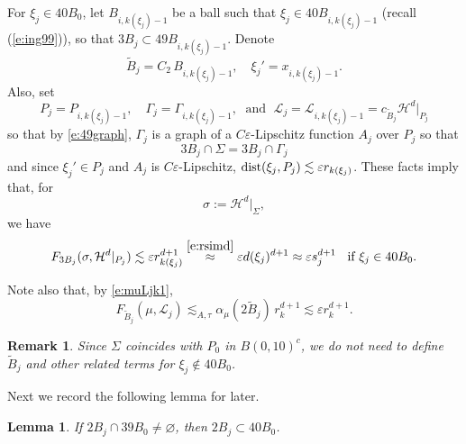 \documentclass[11pt]{amsart}
\newcommand{\HH}{{\mathcal H}}
\newcommand{\LL}{{\mathcal L}}
\newcommand{\dist}{{\rm dist}}
\newcommand{\rf}[1]{{(\ref{#1})}}
\newcommand{\ve}{{\varepsilon}}
\newcommand{\wt}[1]{{\widetilde{#1}}}
\newtheorem{lemma}[theorem]{Lemma}
\newtheorem{remark}[theorem]{Remark}
\theoremstyle{definition}
\theoremstyle{remark}
\numberwithin{equation}{section}
\def\cH{{\mathcal{H}}}
\def\lec{\lesssim}
\def\lec{\lesssim}
\begin{document}
For $\xi_{j}\in 40B_{0}$, let $B_{i,k(\xi_j)-1}$ be a ball such that $\xi_j\in 40 B_{i,k(\xi_j)-1}$ (recall \rf{e:ing99}), 
so that $3B_j\subset 49 B_{i,k(\xi_j)-1}$. Denote
\begin{equation}\label{e:btwid}
\wt{B}_{j}= C_2 \,B_{i,k(\xi_j)-1}, \quad \xi_{j}'=x_{i,k(\xi_j)-1}.
\end{equation}
Also, set 
\[ 
P_{j} = P_{i,k(\xi_j)-1},\quad
\Gamma_{j} = \Gamma_{i,k(\xi_j)-1},  \;\mbox{ and }\; \LL_{j} = \LL_{i,k(\xi_j)-1}= c_{\wt{B}_{j}} \HH^{d}|_{P_{j}}
\]
so that by \eqref{e:49graph},  %
$\Gamma_{j}$ is a graph of a $C\ve$-Lipschitz function $A_{j}$ over $P_{j}$ so that
\begin{equation}\label{e:3bjcapSigma}
3B_{j} \cap \Sigma = 3B_{j}\cap \Gamma_{j} 
\end{equation}
and since $\xi_{j}'\in P_{j}$ and $A_{j}$ is $C\ve$-Lipschitz, $\dist(\xi_{j},P_{j})\lec \ve r_{k(\xi_{j})}$.  These facts imply that,
for 
\[
\sigma:= \HH^{d}|_{\Sigma},
\]
we have
\begin{equation}
\label{e:dHPj}
F_{3B_{j}}(\sigma,\cH^{d}|_{P_{j}}) \lec \ve r_{k(\xi_{j})}^{d+1} \stackrel{\eqref{e:rsimd}}{\approx} \ve d(\xi_{j})^{d+1}\approx \ve s_{j}^{d+1}  \;\; \mbox{ if }\xi_{j}\in 40B_{0}.
\end{equation}
 
Note also that, by \eqref{e:muLjk1},
\begin{equation}\label{e:muLjk}
F_{\wt{B}_{j}}(\mu,\LL_{j})\lec_{A,\tau} \alpha_{\mu}(2\wt{B}_{j})\,r_{k}^{d+1}  \lec \ve r_{k}^{d+1}.
\end{equation}
\begin{remark}\label{r:wheredefined}
Since $\Sigma$ coincides with $P_0$ in $B(0,10)^c$, we do not need to define $\wt{B}_{j}$ and other related terms for $\xi_{j}\not\in 40 B_{0}$.
\end{remark}
 
Next we record the following lemma for later. 

\begin{lemma}\label{l:2Bjinball}
If $2B_{j}\cap 39B_0\neq\varnothing$, then $2B_j\subset 40B_0$. 
\end{lemma}
\end{document}
